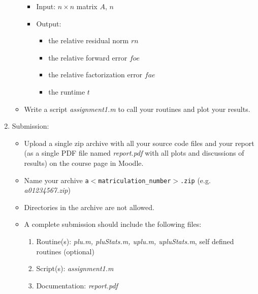 \documentclass{scrartcl}
\begin{document}
\begin{enumerate}
\begin{itemize}
		\vspace{0.2cm}
		\begin{itemize}
			\item Input: $n \times n$ matrix $A$, $n$
			\item Output: 
			\begin{itemize}
				\item the relative residual norm $rn$
				\item the relative forward error $foe$
				\item the relative factorization error $fae$
				\item the runtime $t$
			\end{itemize}
		\end{itemize}
		
		\item Write a script \textit{assignment1.m} to call your routines and plot your results.
	\end{itemize}

	\item Submission:
	\begin{itemize}		
		\item  Upload a single zip archive with all your source code files and your report (as a single
			PDF file named \textit{report.pdf} with all plots and discussions of results) on the course page in Moodle.
		\item Name your archive \texttt{a$<$matriculation\_number$>$.zip} (e.g. \textit{a01234567.zip})
		\item Directories in the archive are not allowed.
		\item A complete submission should include the following files:
		\begin{enumerate}
		\item Routine(s): \textit{plu.m, pluStats.m, uplu.m, upluStats.m}, self defined routines (optional)
		\item Script(s): \textit{assignment1.m}
		\item Documentation: \textit{report.pdf}
		\end{enumerate}
		
		\end{itemize}
	\end{enumerate}
\end{document}
